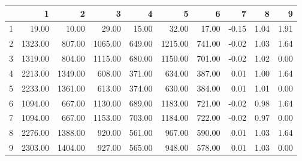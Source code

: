 \begin{table}[ht]
\centering
\begin{tabular}{rrrrrrrrrr}
  \hline
 & 1 & 2 & 3 & 4 & 5 & 6 & 7 & 8 & 9 \\ 
  \hline
1 & 19.00 & 10.00 & 29.00 & 15.00 & 32.00 & 17.00 & -0.15 & 1.04 & 1.91 \\ 
  2 & 1323.00 & 807.00 & 1065.00 & 649.00 & 1215.00 & 741.00 & -0.02 & 1.03 & 1.64 \\ 
  3 & 1319.00 & 804.00 & 1115.00 & 680.00 & 1150.00 & 701.00 & -0.02 & 1.02 & 0.00 \\ 
  4 & 2213.00 & 1349.00 & 608.00 & 371.00 & 634.00 & 387.00 & 0.01 & 1.00 & 1.64 \\ 
  5 & 2233.00 & 1361.00 & 613.00 & 374.00 & 630.00 & 384.00 & 0.01 & 1.01 & 0.00 \\ 
  6 & 1094.00 & 667.00 & 1130.00 & 689.00 & 1183.00 & 721.00 & -0.02 & 0.98 & 1.64 \\ 
  7 & 1094.00 & 667.00 & 1153.00 & 703.00 & 1184.00 & 722.00 & -0.02 & 0.97 & 0.00 \\ 
  8 & 2276.00 & 1388.00 & 920.00 & 561.00 & 967.00 & 590.00 & 0.01 & 1.03 & 1.64 \\ 
  9 & 2303.00 & 1404.00 & 927.00 & 565.00 & 948.00 & 578.00 & 0.01 & 1.03 & 0.00 \\ 
   \hline
\end{tabular}
\end{table}

